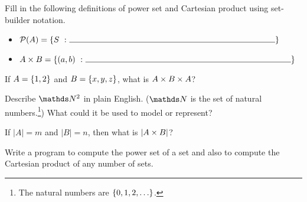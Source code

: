 \begin{exer}
Fill in the following definitions of power set and Cartesian product using set-builder notation.
\begin{itemize}
\item $\powerset{A} = \setbuild{S}{\line(1,0){250}}$
\item $\setproduct{A}{B} = \setbuild{(a, b)}{\line(1,0){250}}$
\end{itemize}
\end{exer}

\begin{exer}
If $A = \left\lbrace 1, 2 \right\rbrace$ and $B = \left\lbrace x ,y, z \right\rbrace$, what is $A \times B \times A$?
\end{exer}

\begin{exer}
Describe $\naturals^2$ in plain English. ($\naturals$ is the set of natural numbers.\footnote{The natural numbers are $\left\lbrace 0, 1, 2, \ldots \right\rbrace$.}) What could it be used to model or represent?
\end{exer}

\begin{exer}
If $|A| = m$ and $|B| = n$, then what is $|A \times B|$?
\end{exer}

\begin{progexer}\happymac
Write a program to compute the power set of a set and also to compute the Cartesian product of any number of sets.
\end{progexer}
